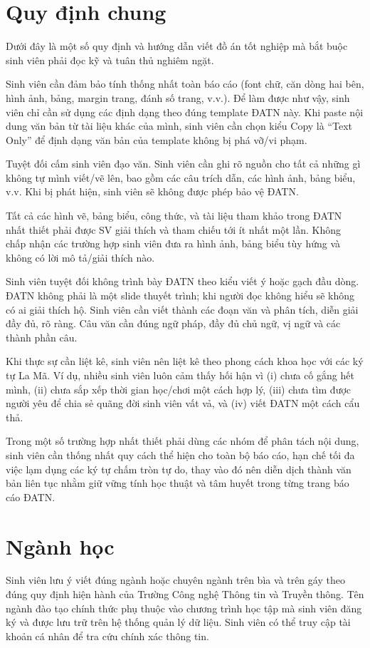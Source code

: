 \documentclass[../DoAn.tex]{subfiles}
\begin{document}
\section*{Quy định chung}
Dưới đây là một số quy định và hướng dẫn viết đồ án tốt nghiệp mà bắt buộc sinh viên phải đọc kỹ và tuân thủ nghiêm ngặt.

Sinh viên cần đảm bảo tính thống nhất toàn báo cáo (font chữ, căn dòng hai bên, hình ảnh, bảng, margin trang, đánh số trang, v.v.). Để làm được như vậy, sinh viên chỉ cần sử dụng các định dạng theo đúng template ĐATN này. Khi paste nội dung văn bản từ tài liệu khác của mình, sinh viên cần chọn kiểu Copy là “Text Only” để định dạng văn bản của template không bị phá vỡ/vi phạm.

Tuyệt đối cấm sinh viên đạo văn. Sinh viên cần ghi rõ nguồn cho tất cả những gì không tự mình viết/vẽ lên, bao gồm các câu trích dẫn, các hình ảnh, bảng biểu, v.v. Khi bị phát hiện, sinh viên sẽ không được phép bảo vệ ĐATN.

Tất cả các hình vẽ, bảng biểu, công thức, và tài liệu tham khảo trong ĐATN nhất thiết phải được SV giải thích và tham chiếu tới ít nhất một lần. Không chấp nhận các trường hợp sinh viên đưa ra hình ảnh, bảng biểu tùy hứng và không có lời mô tả/giải thích nào.

Sinh viên tuyệt đối không trình bày ĐATN theo kiểu viết ý hoặc gạch đầu dòng. ĐATN không phải là một slide thuyết trình; khi người đọc không hiểu sẽ không có ai giải thích hộ. Sinh viên cần viết thành các đoạn văn và phân tích, diễn giải đầy đủ, rõ ràng. Câu văn cần đúng ngữ pháp, đầy đủ chủ ngữ, vị ngữ và các thành phần câu.

Khi thực sự cần liệt kê, sinh viên nên liệt kê theo phong cách khoa học với các ký tự La Mã. Ví dụ, nhiều sinh viên luôn cảm thấy hối hận vì (i) chưa cố gắng hết mình, (ii) chưa sắp xếp thời gian học/chơi một cách hợp lý, (iii) chưa tìm được người yêu để chia sẻ quãng đời sinh viên vất vả, và (iv) viết ĐATN một cách cẩu thả.

Trong một số trường hợp nhất thiết phải dùng các nhóm để phân tách nội dung, sinh viên cần thống nhất quy cách thể hiện cho toàn bộ báo cáo, hạn chế tối đa việc lạm dụng các ký tự chấm tròn tự do, thay vào đó nên diễn dịch thành văn bản liên tục nhằm giữ vững tính học thuật và tâm huyết trong từng trang báo cáo ĐATN.

\section{Ngành học}
Sinh viên lưu ý viết đúng ngành hoặc chuyên ngành trên bìa và trên gáy theo đúng quy định hiện hành của Trường Công nghệ Thông tin và Truyền thông. Tên ngành đào tạo chính thức phụ thuộc vào chương trình học tập mà sinh viên đăng ký và được lưu trữ trên hệ thống quản lý dữ liệu. Sinh viên có thể truy cập tài khoản cá nhân để tra cứu chính xác thông tin. 
\end{document}
